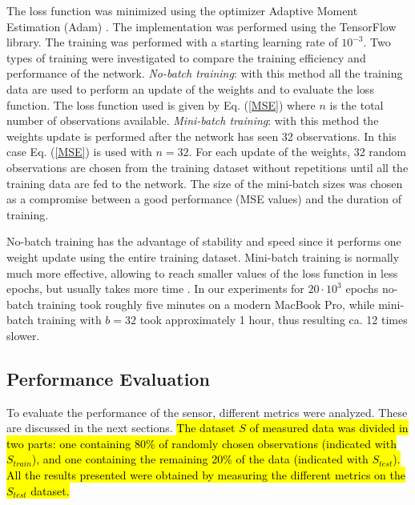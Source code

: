 \documentclass[final,5p,times,twocolumn]{elsarticle}
\begin{document}
The loss function was minimized using the optimizer Adaptive Moment Estimation (Adam) \cite{Kingma2014, Michelucci2017}. The implementation was performed using the TensorFlow\texttrademark $\ $library. The training was performed with a starting learning rate of $10^{-3}$. Two types of training were investigated to compare the training efficiency and performance of the network. {\sl No-batch training}: with this method all the training data  are used to perform an update of the weights and to evaluate the loss function. The loss function used is given by Eq. (\ref{MSE}) where $n$ is the total number of observations available. {\sl Mini-batch training}: with this method the weights update is performed after the network has seen 32 observations. In this case Eq. (\ref{MSE}) is used with $n=32$. For each update of the weights, 32 random observations are chosen from the training dataset without repetitions until all the training data are fed to the network. 
The size of the mini-batch sizes was chosen as a compromise between a good performance (MSE values) and the duration of training.

No-batch training has the advantage of stability and speed since it performs one weight update using the entire training dataset. Mini-batch training is normally much more effective, allowing to reach smaller values of the loss function in less epochs, but usually takes more time \cite{Michelucci2017}. In our experiments for $20 \cdot 10^3$ epochs no-batch training took roughly five minutes on a modern MacBook Pro, while mini-batch training with $b=32$ took approximately 1 hour, thus resulting ca. 12 times slower. 


\subsection{Performance Evaluation}

To evaluate the performance of the sensor, different metrics were analyzed. These are discussed in the next sections. \hl{The dataset $S$ of measured data was divided in two parts: one containing 80\% of randomly chosen observations (indicated with $S_{train}$), and one containing the remaining 20\% of the data (indicated with $S_{test}$). All the results presented were obtained by measuring the different metrics on the $S_{test}$ dataset.}
\end{document}
